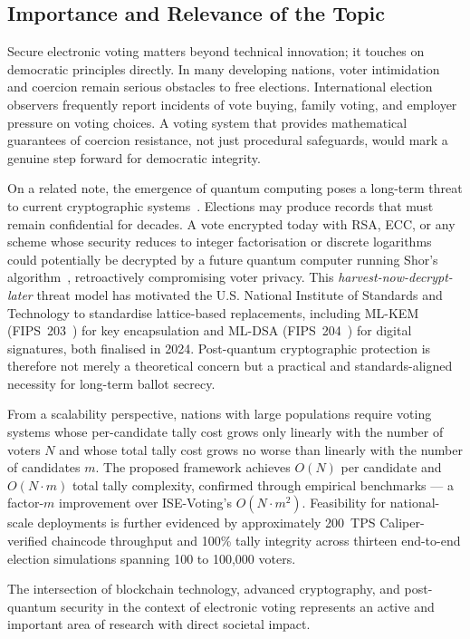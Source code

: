 \subsection{Importance and Relevance of the Topic}
\label{subsec:importance}

Secure electronic voting matters beyond technical innovation; it touches on democratic principles directly. In many developing nations, voter intimidation and coercion remain serious obstacles to free elections. International election observers frequently report incidents of vote buying, family voting, and employer pressure on voting choices. A voting system that provides mathematical guarantees of coercion resistance, not just procedural safeguards, would mark a genuine step forward for democratic integrity.

On a related note, the emergence of quantum computing poses a long-term threat to current cryptographic systems~\cite{shor1997}. Elections may produce records that must remain confidential for decades. A vote encrypted today with RSA, ECC, or any scheme whose security reduces to integer factorisation or discrete logarithms could potentially be decrypted by a future quantum computer running Shor's algorithm~\cite{shor1997}, retroactively compromising voter privacy. This \emph{harvest-now-decrypt-later} threat model has motivated the U.S. National Institute of Standards and Technology to standardise lattice-based replacements, including ML-KEM (FIPS~203~\cite{nist_kyber}) for key encapsulation and ML-DSA (FIPS~204~\cite{nist_mldsa}) for digital signatures, both finalised in 2024. Post-quantum cryptographic protection is therefore not merely a theoretical concern but a practical and standards-aligned necessity for long-term ballot secrecy.

From a scalability perspective, nations with large populations require voting systems whose per-candidate tally cost grows only linearly with the number of voters $N$ and whose total tally cost grows no worse than linearly with the number of candidates $m$. The proposed framework achieves $O(N)$ per candidate and $O(N \cdot m)$ total tally complexity, confirmed through empirical benchmarks --- a factor-$m$ improvement over ISE-Voting's $O(N \cdot m^{2})$. Feasibility for national-scale deployments is further evidenced by approximately 200~TPS Caliper-verified chaincode throughput and 100\% tally integrity across thirteen end-to-end election simulations spanning 100 to 100{,}000 voters.

The intersection of blockchain technology, advanced cryptography, and post-quantum security in the context of electronic voting represents an active and important area of research with direct societal impact.

